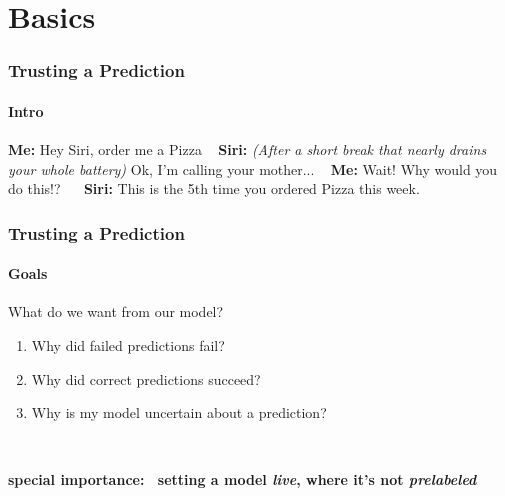 \section{Basics}

\begin{frame}
	\frametitle{Trusting a Prediction}
	\framesubtitle{Intro}
	\begin{LARGE}
		\textbf{Me:} Hey Siri, order me a Pizza \newline  ~\newline
		\textbf{Siri:} \textit{(After a short break that nearly drains your whole battery)} Ok, I'm calling your mother... \newline  ~\newline
		\textbf{Me:} Wait! Why would you do this!? ~\newline ~\newline
		\textbf{Siri:} This is the 5th time you ordered Pizza this week. \newline ~\newline
	\end{LARGE} 
\end{frame}

\begin{frame}
	\frametitle{Trusting a Prediction}
	\framesubtitle{Goals}
	\begin{Large}
		What do we want from our model? ~\newline
		
		\begin{enumerate}
			\item Why did failed predictions fail?
			\item Why did correct predictions succeed?
			\item Why is my model uncertain about a prediction?
		\end{enumerate} ~\newline~\newline
	
	\textbf{special importance: ~\newline setting a model \textit{live}, where it's not \textit{prelabeled}}
	\end{Large}
\end{frame}

